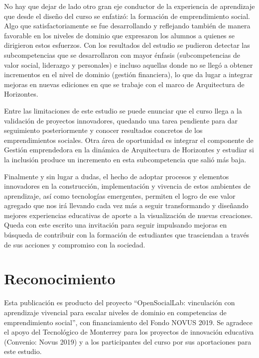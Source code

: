 \documentclass[spanish]{textolivre}
\begin{document}
No hay que dejar de lado otro gran eje conductor de la experiencia de aprendizaje que desde el diseño del curso se enfatizó: la formación de emprendimiento social. Algo que satisfactoriamente se fue desarrollando y reflejando también de manera favorable en los niveles de dominio que expresaron los alumnos a quienes se dirigieron estos esfuerzos. Con los resultados del estudio se pudieron detectar las subcompetencias que se desarrollaron con mayor énfasis (subcompetencias de valor social, liderazgo y personales) e incluso aquellas donde no se llegó a obtener incrementos en el nivel de dominio (gestión financiera), lo que da lugar a integrar mejoras en nuevas ediciones en que se trabaje con el marco de Arquitectura de Horizontes.

Entre las limitaciones de este estudio se puede enunciar que el curso llega a la validación de proyectos innovadores, quedando una tarea pendiente para dar seguimiento posteriormente y conocer resultados concretos de los emprendimientos sociales. Otra área de oportunidad es integrar el componente de Gestión emprendedora en la dinámica de Arquitectura de Horizontes y estudiar si la inclusión produce un incremento en esta subcompetencia que salió más baja.

Finalmente y sin lugar a dudas, el hecho de adoptar procesos y elementos innovadores en la construcción, implementación y vivencia de estos ambientes de aprendizaje, así como tecnologías emergentes, permiten el logro de ese valor agregado que nos irá llevando cada vez más a seguir transformando y diseñando mejores experiencias educativas de aporte a la visualización de nuevas creaciones. Queda con este escrito una invitación para seguir impulsando mejoras en búsqueda de contribuir con la formación de estudiantes que trasciendan a través de sus acciones y compromiso con la sociedad.

\section*{Reconocimiento}
Esta publicación es producto del proyecto “OpenSocialLab: vinculación con aprendizaje vivencial para escalar niveles de dominio en competencias de emprendimiento social”, con financiamiento del Fondo NOVUS 2019. Se agradece el apoyo del Tecnológico de Monterrey para los proyectos de innovación educativa (Convenio: Novus 2019) y a los participantes del curso por sus aportaciones para este estudio.


\printbibliography\label{sec-bib}
\end{document}
